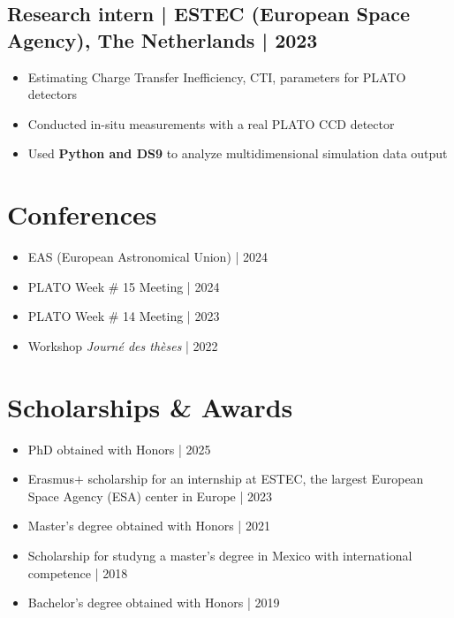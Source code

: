 \documentclass[11pt,a4paper]{article}
\begin{document}
\begin{multicols}{2}
		\subsection{Research intern | ESTEC (European Space Agency), The Netherlands | 2023}
		\begin{itemize}
			\item Estimating Charge Transfer Inefficiency, CTI, parameters for PLATO detectors
			\item Conducted in-situ measurements with a real PLATO CCD detector
			\item Used \textbf{Python and DS9} to analyze multidimensional simulation data output
		\end{itemize}
		
	\end{multicols}
	
	\section{Conferences}

		\begin{itemize}
			\item EAS (European Astronomical Union) | 2024
			\item PLATO Week \# 15 Meeting | 2024
			\item PLATO Week \# 14 Meeting | 2023
			\item Workshop \textit{Journé des thèses} | 2022
		\end{itemize}

	
	\section{Scholarships \& Awards}
	\begin{itemize}
		\item PhD obtained with Honors | 2025
		\item Erasmus$+$ scholarship for an internship at ESTEC, the largest European Space Agency (ESA) center in Europe | 2023
		\item Master's degree obtained with Honors | 2021
		\item Scholarship for studyng a master's degree in Mexico with international competence | 2018
		\item Bachelor's degree obtained with Honors | 2019
	\end{itemize}
	
\end{document}
